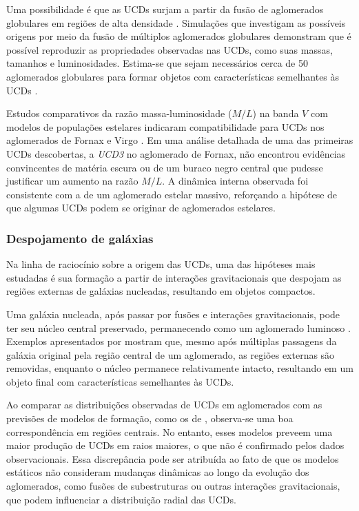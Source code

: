 Uma possibilidade é que as UCDs surjam a partir da fusão de aglomerados globulares em regiões de alta densidade \citep{Fellhauer_2002}. Simulações que investigam as possíveis origens por meio da fusão de múltiplos aglomerados globulares \citep{Goerdt_2008} demonstram que é possível reproduzir as propriedades observadas nas UCDs, como suas massas, tamanhos e luminosidades. Estima-se que sejam necessários cerca de 50 aglomerados globulares para formar objetos com características semelhantes às UCDs \citep{Goerdt_2008}.

Estudos comparativos da razão massa-luminosidade ($M/L$) na banda $V$ com modelos de populações estelares indicaram compatibilidade para UCDs nos aglomerados de Fornax \citep{Hilker_2006} e Virgo \citep{Evstigneeva_2007}. Em uma análise detalhada de uma das primeiras UCDs descobertas, a \textit{UCD3} no aglomerado de Fornax, \cite{Frank_2011} não encontrou evidências convincentes de matéria escura ou de um buraco negro central que pudesse justificar um aumento na razão $M/L$. A dinâmica interna observada foi consistente com a de um aglomerado estelar massivo, reforçando a hipótese de que algumas UCDs podem se originar de aglomerados estelares.

\subsubsection{Despojamento de galáxias}\label{subsubsec:Galaxy stripping}
Na linha de raciocínio sobre a origem das UCDs, uma das hipóteses mais estudadas é sua formação a partir de interações gravitacionais que despojam as regiões externas de galáxias nucleadas, resultando em objetos compactos.

Uma galáxia nucleada, após passar por fusões e interações gravitacionais, pode ter seu núcleo central preservado, permanecendo como um aglomerado luminoso \citep{Bassino_1994}. Exemplos apresentados por \cite{Bekki_2001} mostram que, mesmo após múltiplas passagens da galáxia original pela região central de um aglomerado, as regiões externas são removidas, enquanto o núcleo permanece relativamente intacto, resultando em um objeto final com características semelhantes às UCDs.

Ao comparar as distribuições observadas de UCDs em aglomerados com as previsões de modelos de formação, como os de \cite{Thomas_2008}, observa-se uma boa correspondência em regiões centrais. No entanto, esses modelos preveem uma maior produção de UCDs em raios maiores, o que não é confirmado pelos dados observacionais. Essa discrepância pode ser atribuída ao fato de que os modelos estáticos não consideram mudanças dinâmicas ao longo da evolução dos aglomerados, como fusões de subestruturas ou outras interações gravitacionais, que podem influenciar a distribuição radial das UCDs.

